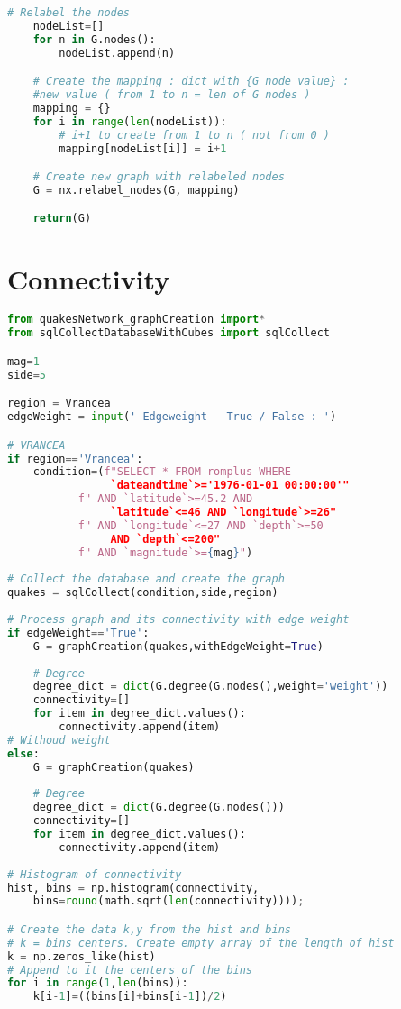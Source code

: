 \documentclass[12pt, twoside]{report}
\begin{document}
\begin{appendices}
\begin{lstlisting}[language=python, frame=single, tabsize=1]
	# Relabel the nodes
	nodeList=[]
	for n in G.nodes():
		nodeList.append(n)

	# Create the mapping : dict with {G node value} : 
	#new value ( from 1 to n = len of G nodes )    
	mapping = {}
	for i in range(len(nodeList)):
		# i+1 to create from 1 to n ( not from 0 ) 
		mapping[nodeList[i]] = i+1

	# Create new graph with relabeled nodes
	G = nx.relabel_nodes(G, mapping)

	return(G)

\end{lstlisting}


\chapter{Connectivity}

\begin{lstlisting}[language=python, frame=single, tabsize=1] 
from quakesNetwork_graphCreation import*
from sqlCollectDatabaseWithCubes import sqlCollect

mag=1
side=5

region = Vrancea
edgeWeight = input(' Edgeweight - True / False : ')

# VRANCEA
if region=='Vrancea':
	condition=(f"SELECT * FROM romplus WHERE 
				`dateandtime`>='1976-01-01 00:00:00'"
		   f" AND `latitude`>=45.2 AND 
		   		`latitude`<=46 AND `longitude`>=26" 
		   f" AND `longitude`<=27 AND `depth`>=50 
		   		AND `depth`<=200"
		   f" AND `magnitude`>={mag}")
		   
# Collect the database and create the graph
quakes = sqlCollect(condition,side,region)
		
# Process graph and its connectivity with edge weight
if edgeWeight=='True':
	G = graphCreation(quakes,withEdgeWeight=True)
		
	# Degree
	degree_dict = dict(G.degree(G.nodes(),weight='weight'))
	connectivity=[]
	for item in degree_dict.values():
		connectivity.append(item)
# Withoud weight
else:
	G = graphCreation(quakes)
			
	# Degree
	degree_dict = dict(G.degree(G.nodes()))
	connectivity=[]
	for item in degree_dict.values():
		connectivity.append(item)
		
# Histogram of connectivity
hist, bins = np.histogram(connectivity,
    bins=round(math.sqrt(len(connectivity))));

# Create the data k,y from the hist and bins
# k = bins centers. Create empty array of the length of hist
k = np.zeros_like(hist)
# Append to it the centers of the bins
for i in range(1,len(bins)):
	k[i-1]=((bins[i]+bins[i-1])/2)


\end{lstlisting}
\end{appendices}
\end{document}
